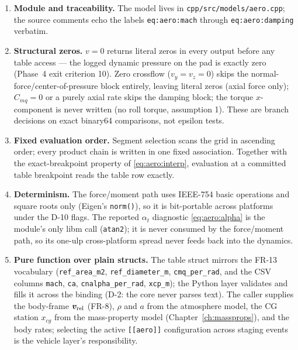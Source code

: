 \begin{enumerate}
  \item \textbf{Module and traceability.} The model lives in
    \texttt{cpp/src/models/aero.cpp}; the source comments echo the labels
    \texttt{eq:aero:mach} through \texttt{eq:aero:damping} verbatim.
  \item \textbf{Structural zeros.} $v = 0$ returns literal zeros in every
    output before any table access --- the logged dynamic pressure on the
    pad is exactly zero (Phase~4 exit criterion 10). Zero crossflow
    ($v_y = v_z = 0$) skips the normal-force/center-of-pressure block
    entirely, leaving literal zeros (axial force only); $C_{mq} = 0$ or a
    purely axial rate skips the damping block; the torque $x$-component
    is never written (no roll torque, assumption 1). These are branch
    decisions on exact binary64 comparisons, not epsilon tests.
  \item \textbf{Fixed evaluation order.} Segment selection scans the grid
    in ascending order; every product chain is written in one fixed
    association. Together with the exact-breakpoint property of
    \eqref{eq:aero:interp}, evaluation at a committed table breakpoint
    reads the table row exactly.
  \item \textbf{Determinism.} The force/moment path uses IEEE-754 basic
    operations and square roots only (Eigen's \texttt{norm()}), so it is
    bit-portable across platforms under the D-10 flags. The reported
    $\alpha_t$ diagnostic \eqref{eq:aero:alpha} is the module's only libm
    call (\texttt{atan2}); it is never consumed by the force/moment path,
    so its one-ulp cross-platform spread never feeds back into the
    dynamics.
  \item \textbf{Pure function over plain structs.} The table struct
    mirrors the FR-13 vocabulary (\texttt{ref\_area\_m2},
    \texttt{ref\_diameter\_m}, \texttt{cmq\_per\_rad}, and the CSV
    columns \texttt{mach}, \texttt{ca}, \texttt{cnalpha\_per\_rad},
    \texttt{xcp\_m}); the Python layer validates and fills it across the
    binding (D-2: the core never parses text). The caller supplies the
    body-frame $\bm{v}_{\mathrm{rel}}$ (FR-8), $\rho$ and $a$ from the
    atmosphere model, the CG station $x_{cg}$ from the mass-property
    model (Chapter~\ref{ch:massprops}), and the body rates; selecting the
    active \texttt{[[aero]]} configuration across staging events is the
    vehicle layer's responsibility.
\end{enumerate}

